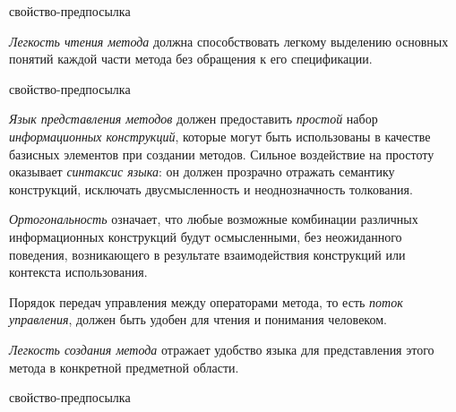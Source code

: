 \begin{SCn}
\begin{scnrelfromlist}{свойство-предпосылка}
\end{scnrelfromlist}
\end{SCn}

\textit{Легкость чтения метода} должна способствовать легкому выделению основных понятий каждой части метода без обращения к его спецификации.

\begin{SCn}
\begin{scnrelfromlist}{свойство-предпосылка}
\end{scnrelfromlist}
\end{SCn}

\textit{Язык представления методов} должен предоставить \textit{простой} набор \textit{информационных конструкций}, которые могут быть использованы в качестве базисных элементов при создании методов.
Сильное воздействие на простоту оказывает \textit{синтаксис языка}: он должен прозрачно отражать семантику конструкций, исключать двусмысленность и неоднозначность толкования.

\textit{Ортогональность} означает, что любые возможные комбинации различных информационных конструкций будут осмысленными, без неожиданного поведения, возникающего в результате взаимодействия конструкций или контекста использования.

Порядок передач управления между операторами метода, то есть \textit{поток управления}, должен быть удобен для чтения и понимания человеком.

\textit{Легкость создания метода} отражает удобство языка для представления этого метода в конкретной предметной области.

\begin{SCn}
\begin{scnrelfromlist}{свойство-предпосылка}
\end{scnrelfromlist}
\end{SCn}

